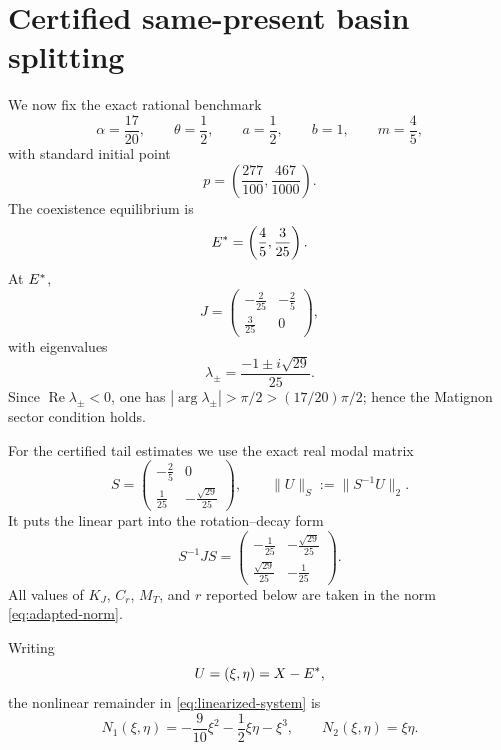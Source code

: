 \section{Certified same-present basin splitting}
\label{sec:principal-theorem}

We now fix the exact rational benchmark
\begin{equation}
  \alpha=\frac{17}{20},
  \qquad
  \theta=\frac12,
  \qquad
  a=\frac12,
  \qquad
  b=1,
  \qquad
  m=\frac45,
  \label{eq:B215-parameters}
\end{equation}
with standard initial point
\begin{equation}
  p=
  \left(
  \frac{277}{100},
  \frac{467}{1000}
  \right).
  \label{eq:B215-p}
\end{equation}
The coexistence equilibrium is
\begin{equation}
  E^{*}=
  \left(
  \frac45,\frac3{25}
  \right).
  \label{eq:B215-E}
\end{equation}
At \(E^{*}\),
\begin{equation}
  J=
  \begin{pmatrix}
    -\frac2{25} & -\frac25\\[1mm]
    \frac3{25} & 0
  \end{pmatrix},
  \label{eq:B215-J}
\end{equation}
with eigenvalues
\[
  \lambda_\pm
  =
  \frac{-1\pm i\sqrt{29}}{25}.
\]
Since \(\operatorname{Re}\lambda_\pm<0\), one has \(|\arg\lambda_\pm|>\pi/2>(17/20)\pi/2\); hence the Matignon sector condition holds.

For the certified tail estimates we use the exact real modal matrix
\begin{equation}
  S=
  \begin{pmatrix}
    -\frac25 & 0\\[1mm]
    \frac1{25} & -\frac{\sqrt{29}}{25}
  \end{pmatrix},
  \qquad
  \|U\|_S:=\|S^{-1}U\|_2.
  \label{eq:adapted-norm}
\end{equation}
It puts the linear part into the rotation--decay form
\[
  S^{-1}JS
  =
  \begin{pmatrix}
    -\frac1{25} & -\frac{\sqrt{29}}{25}\\[1mm]
    \frac{\sqrt{29}}{25} & -\frac1{25}
  \end{pmatrix}.
\]
All values of \(K_J\), \(C_r\), \(M_T\), and \(r\) reported below are taken in the norm \eqref{eq:adapted-norm}.

Writing
\[
  U=(\xi,\eta)=X-E^{*},
\]
the nonlinear remainder in \eqref{eq:linearized-system} is
\begin{equation}
  N_1(\xi,\eta)
  =
  -\frac9{10}\xi^2
  -\frac12\xi\eta
  -\xi^3,
  \qquad
  N_2(\xi,\eta)=\xi\eta.
  \label{eq:B215-remainder}
\end{equation}

